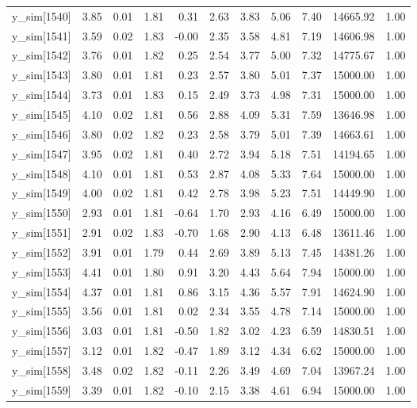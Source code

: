 \begin{table}[ht]
\begin{tabular}{rrrrrrrrrrr}
  y\_sim[1540] & 3.85 & 0.01 & 1.81 & 0.31 & 2.63 & 3.83 & 5.06 & 7.40 & 14665.92 & 1.00 \\ 
  y\_sim[1541] & 3.59 & 0.02 & 1.83 & -0.00 & 2.35 & 3.58 & 4.81 & 7.19 & 14606.98 & 1.00 \\ 
  y\_sim[1542] & 3.76 & 0.01 & 1.82 & 0.25 & 2.54 & 3.77 & 5.00 & 7.32 & 14775.67 & 1.00 \\ 
  y\_sim[1543] & 3.80 & 0.01 & 1.81 & 0.23 & 2.57 & 3.80 & 5.01 & 7.37 & 15000.00 & 1.00 \\ 
  y\_sim[1544] & 3.73 & 0.01 & 1.83 & 0.15 & 2.49 & 3.73 & 4.98 & 7.31 & 15000.00 & 1.00 \\ 
  y\_sim[1545] & 4.10 & 0.02 & 1.81 & 0.56 & 2.88 & 4.09 & 5.31 & 7.59 & 13646.98 & 1.00 \\ 
  y\_sim[1546] & 3.80 & 0.02 & 1.82 & 0.23 & 2.58 & 3.79 & 5.01 & 7.39 & 14663.61 & 1.00 \\ 
  y\_sim[1547] & 3.95 & 0.02 & 1.81 & 0.40 & 2.72 & 3.94 & 5.18 & 7.51 & 14194.65 & 1.00 \\ 
  y\_sim[1548] & 4.10 & 0.01 & 1.81 & 0.53 & 2.87 & 4.08 & 5.33 & 7.64 & 15000.00 & 1.00 \\ 
  y\_sim[1549] & 4.00 & 0.02 & 1.81 & 0.42 & 2.78 & 3.98 & 5.23 & 7.51 & 14449.90 & 1.00 \\ 
  y\_sim[1550] & 2.93 & 0.01 & 1.81 & -0.64 & 1.70 & 2.93 & 4.16 & 6.49 & 15000.00 & 1.00 \\ 
  y\_sim[1551] & 2.91 & 0.02 & 1.83 & -0.70 & 1.68 & 2.90 & 4.13 & 6.48 & 13611.46 & 1.00 \\ 
  y\_sim[1552] & 3.91 & 0.01 & 1.79 & 0.44 & 2.69 & 3.89 & 5.13 & 7.45 & 14381.26 & 1.00 \\ 
  y\_sim[1553] & 4.41 & 0.01 & 1.80 & 0.91 & 3.20 & 4.43 & 5.64 & 7.94 & 15000.00 & 1.00 \\ 
  y\_sim[1554] & 4.37 & 0.01 & 1.81 & 0.86 & 3.15 & 4.36 & 5.57 & 7.91 & 14624.90 & 1.00 \\ 
  y\_sim[1555] & 3.56 & 0.01 & 1.81 & 0.02 & 2.34 & 3.55 & 4.78 & 7.14 & 15000.00 & 1.00 \\ 
  y\_sim[1556] & 3.03 & 0.01 & 1.81 & -0.50 & 1.82 & 3.02 & 4.23 & 6.59 & 14830.51 & 1.00 \\ 
  y\_sim[1557] & 3.12 & 0.01 & 1.82 & -0.47 & 1.89 & 3.12 & 4.34 & 6.62 & 15000.00 & 1.00 \\ 
  y\_sim[1558] & 3.48 & 0.02 & 1.82 & -0.11 & 2.26 & 3.49 & 4.69 & 7.04 & 13967.24 & 1.00 \\ 
  y\_sim[1559] & 3.39 & 0.01 & 1.82 & -0.10 & 2.15 & 3.38 & 4.61 & 6.94 & 15000.00 & 1.00 \\ 

\end{tabular}
\end{table}
